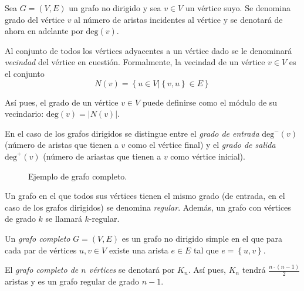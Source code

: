 \begin{definition}\label{def:neighborhood}
Sea $G=(V,E)$ un grafo no dirigido y sea $v \in V$ un vértice suyo. Se denomina grado del vértice $v$ al número de aristas incidentes al vértice y se denotará de ahora en adelante por $\text{deg}(v)$.

Al conjunto de todos los vértices adyacentes a un vértice dado se le denominará \emph{vecindad} del vértice en cuestión. Formalmente, la vecindad de un vértice $v \in V$ es el conjunto
\begin{equation}
N(v) = \left\lbrace u \in V | \left\lbrace v,u\right\rbrace \in E \right\rbrace
\end{equation}

Así pues, el grado de un vértice $v \in V$ puede definirse como el módulo de su vecindario: $\text{deg}(v) = |N(v)|$.

En el caso de los grafos dirigidos se distingue entre el \emph{grado de entrada} $\text{deg}^-(v)$ (número de aristas que tienen a $v$ como el vértice final) y el \emph{grado de salida} $\text{deg}^+(v)$ (número de ariastas que tienen a $v$ como vértice inicial). 
\end{definition}


\begin{figure}[H]
\centering
{}
\caption{Ejemplo de grafo completo.}
	\label{fig:grafo5}
\end{figure}

\begin{definition}
Un grafo en el que todos sus vértices tienen el mismo grado (de entrada, en el caso de los grafos dirigidos) se denomina \emph{regular}. Además, un grafo con vértices de grado $k$ se llamará $k$-regular.
\end{definition}

\begin{definition}
Un \emph{grafo completo} $G=(V,E)$ es un grafo no dirigido simple en el que para cada par de vértices $u, v\in V$ existe una arista $e \in E$ tal que $e = \left\lbrace u,v\right\rbrace$.

El \emph{grafo completo de $n$ vértices} se denotará por $K_n$. Así pues, $K_n$ tendrá $\frac{n\cdot (n-1)}{2}$ aristas y es un grafo regular de grado $n-1$.
\end{definition}

